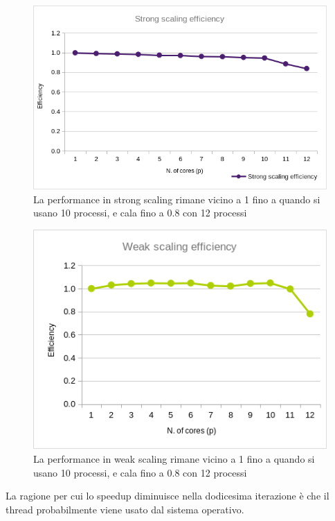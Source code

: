 \documentclass[a4paper,11pt, twoside]{report}
\begin{document}
\begin{figure}
    \includegraphics[scale=0.5]{images/mpi_strong.png}
    \caption[short]{La performance in strong scaling rimane vicino a 1 fino a quando si usano 10 processi, e cala fino a 0.8 con 12 processi}
\end{figure}
\begin{figure}
    \includegraphics[scale=0.5]{images/mpi_weak.png}
    \caption[short]{La performance in weak scaling rimane vicino a 1 fino a quando si usano 10 processi, e cala fino a 0.8 con 12 processi} 
\end{figure}
\newline
La ragione per cui lo speedup diminuisce nella dodicesima iterazione è che il thread probabilmente viene usato dal sistema operativo.
\end{document}
